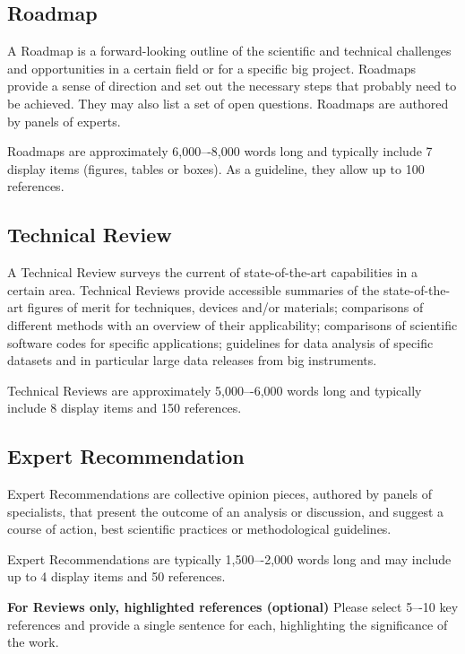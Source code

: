 \documentclass[fleqn,10pt]{wlscirep}
\begin{document}
\subsection*{Roadmap}

A Roadmap is a forward-looking outline of the scientific and technical challenges and opportunities in a certain field or for a specific big project. Roadmaps provide a sense of direction and set out the necessary steps that probably need to be achieved. They may also list a set of open questions. Roadmaps are authored by panels of experts.

Roadmaps are approximately 6,000–-8,000 words long and typically include 7 display items (figures, tables or boxes). As a guideline, they allow up to 100 references. 

\subsection*{Technical Review}

A Technical Review\cite{TR} surveys the current of state-of-the-art capabilities in a certain area. Technical Reviews provide accessible summaries of the state-of-the-art figures of merit for techniques, devices and/or materials; comparisons of different methods with an overview of their applicability; comparisons of scientific software codes for specific applications; guidelines for data analysis of specific datasets and in particular large data releases from big instruments.

Technical Reviews are approximately 5,000–-6,000 words long and typically include 8 display items and 150 references. 
\subsection*{Expert Recommendation}

Expert Recommendations are collective opinion pieces, authored by panels of specialists, that present the outcome of an analysis or discussion, and suggest a course of action, best scientific practices or methodological guidelines.

Expert Recommendations are typically 1,500–-2,000 words long and may include up to 4 display items and 50 references.



\noindent \textbf{For Reviews only, highlighted references (optional)} Please select 5–-10 key references and provide a single sentence for each, highlighting the significance of the work.
\end{document}
